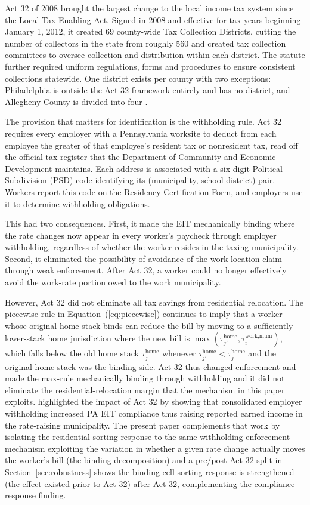 \documentclass[12pt]{article}
\begin{document}
Act 32 of 2008 \citep{paAct32_2008} brought the largest change to the
local income tax system since the Local Tax Enabling Act. Signed in 2008 and effective for tax years beginning January 1, 2012, it
created 69 county-wide Tax Collection Districts, cutting the number of
collectors in the state from roughly 560 and created tax collection
committees to oversee collection and distribution within each district.
The statute further required uniform regulations, forms and procedures to ensure
consistent collections statewide. One district exists per county with two
exceptions: Philadelphia is outside the Act 32 framework entirely and has
no district, and Allegheny County is divided into four
\citep{paDeskbook2025}.

The provision that matters for identification is the withholding rule.
Act 32 requires every employer with a Pennsylvania worksite to deduct
from each employee the greater of that employee's resident tax or
nonresident tax, read off the official tax register that the Department
of Community and Economic Development
maintains. Each address is
associated with a six-digit Political Subdivision (PSD) code identifying
its (municipality, school district) pair. Workers report this code on the
Residency Certification Form, and employers use it to determine
withholding obligations.

This had two consequences.
First, it made the EIT mechanically binding where the rate changes now
appear in every worker's paycheck through employer withholding,
regardless of whether the worker resides in the taxing municipality.
Second, it eliminated the possibility of avoidance
of the work-location claim through weak enforcement.
After Act 32, a worker could no longer effectively avoid the
work-rate portion owed to the work municipality.

However, Act 32 did not eliminate all tax savings from
residential relocation. The piecewise rule in
Equation~(\ref{eq:piecewise}) continues to imply that a worker whose
original home stack binds can reduce the bill by moving to a
sufficiently lower-stack home jurisdiction where the new bill is
$\max(\tau^{\text{home}}_{j'}, \tau^{\text{work,muni}}_i)$, which falls
below the old home stack $\tau^{\text{home}}_j$ whenever
$\tau^{\text{home}}_{j'} < \tau^{\text{home}}_j$ and the original
home stack was the binding side. Act 32 thus changed enforcement
and made the max-rule mechanically binding through withholding and it
did not eliminate the residential-relocation margin that the
mechanism in this paper exploits.
\citet{bagchiEffectsIntroducingWithholding2022} highlighted the impact of Act 32 by showing that consolidated employer
withholding increased PA EIT compliance thus raising reported earned
income in the rate-raising municipality. The present paper complements that work by isolating
the residential-sorting response to the same withholding-enforcement
mechanism exploiting the variation in whether a given
rate change actually moves the worker's bill (the binding
decomposition) and a pre/post-Act-32 split in
Section~\ref{sec:robustness} shows the binding-cell sorting
response is strengthened (the effect existed prior to Act 32) after Act 32, complementing the
compliance-response finding.
\end{document}
